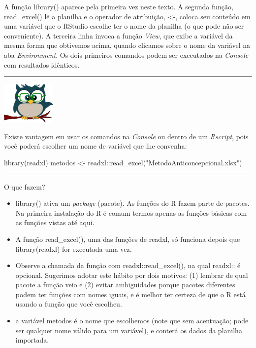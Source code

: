 \documentclass[
]{article}
\newenvironment{Shaded}{\begin{snugshade}}{\end{snugshade}}
\newcommand{\FunctionTok}[1]{\textcolor[rgb]{0.00,0.00,0.00}{#1}}
\newcommand{\NormalTok}[1]{#1}
\newcommand{\OtherTok}[1]{\textcolor[rgb]{0.56,0.35,0.01}{#1}}
\newcommand{\SpecialCharTok}[1]{\textcolor[rgb]{0.00,0.00,0.00}{#1}}
\newcommand{\StringTok}[1]{\textcolor[rgb]{0.31,0.60,0.02}{#1}}
\providecommand{\tightlist}{%
  \setlength{\itemsep}{0pt}\setlength{\parskip}{0pt}}
\begin{document}
A função library() aparece pela primeira vez neste texto. A segunda
função, read\_excel() lê a planilha e o operador de atribuição,
\textless-, coloca seu conteúdo em uma variável que o RStudio escolhe
ter o nome da planilha (o que pode não ser conveniente). A terceira
linha invoca a função \emph{View}, que exibe a variável da mesma forma
que obtivemos acima, quando clicamos sobre o nome da variável na aba
\emph{Environment}. Os dois primeiros comandos podem ser executados na
\emph{Console} com resultados idênticos.

\begin{center}\rule{0.5\linewidth}{0.5pt}\end{center}

\begin{flushleft}\includegraphics[width=0.08\linewidth]{coruja} \end{flushleft}

Existe vantagem em usar os comandos na \emph{Console} ou dentro de um
\emph{Rscript}, pois você poderá escolher um nome de variável que lhe
convenha:

\begin{Shaded}
\begin{Highlighting}[]
\FunctionTok{library}\NormalTok{(readxl)}
\NormalTok{metodos }\OtherTok{\textless{}{-}}\NormalTok{ readxl}\SpecialCharTok{::}\FunctionTok{read\_excel}\NormalTok{(}\StringTok{"MetodoAnticoncepcional.xlsx"}\NormalTok{)}
\end{Highlighting}
\end{Shaded}

\begin{center}\rule{0.5\linewidth}{0.5pt}\end{center}

O que fazem?

\begin{itemize}
\tightlist
\item
  library() ativa um \emph{package} (pacote). As funções do R fazem
  parte de pacotes. Na primeira instalação do R é comum termos apenas as
  funções básicas com as funções vistas até aqui.
\item
  A função read\_excel(), uma das funções de readxl, só funciona depois
  que library(readxl) for executada uma vez.
\item
  Observe a chamada da função com readxl::read\_excel(), na qual
  readxl:: é opcional. Sugerimos adotar este hábito por dois motivos:
  (1) lembrar de qual pacote a função veio e (2) evitar ambiguidades
  porque pacotes diferentes podem ter funções com nomes iguais, e é
  melhor ter certeza de que o R está usando a função que você escolheu.
\item
  a variável metodos é o nome que escolhemos (note que sem acentuação;
  pode ser qualquer nome válido para um variável), e conterá os dados da
  planilha importada.
\end{itemize}
\end{document}
